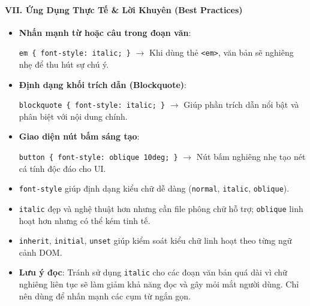 \documentclass[11pt,oneside]{book}
\newcommand{\codeinline}[1]{\textcolor{accentOrange}{\texttt{#1}}}
\begin{document}
\paragraph*{VII. Ứng Dụng Thực Tế \& Lời Khuyên (Best Practices)}

\begin{tipBox}
\begin{itemize}[leftmargin=1.5em, itemsep=4pt, parsep=0pt]
    \item \textbf{Nhấn mạnh từ hoặc câu trong đoạn văn}:
    \par\vspace{2pt}
    \codeinline{em \{ font-style: italic; \}} $\rightarrow$ Khi dùng thẻ \codeinline{<em>}, văn bản sẽ nghiêng nhẹ để thu hút sự chú ý.
    \item \textbf{Định dạng khối trích dẫn (Blockquote)}:
    \par\vspace{2pt}
    \codeinline{blockquote \{ font-style: italic; \}} $\rightarrow$ Giúp phần trích dẫn nổi bật và phân biệt với nội dung chính.
    \item \textbf{Giao diện nút bấm sáng tạo}:
    \par\vspace{2pt}
    \codeinline{button \{ font-style: oblique 10deg; \}} $\rightarrow$ Nút bấm nghiêng nhẹ tạo nét cá tính độc đáo cho UI.
\end{itemize}
\end{tipBox}

\begin{conceptBox}
\begin{itemize}[leftmargin=1.5em, itemsep=3pt, parsep=0pt]
    \item \codeinline{font-style} giúp định dạng kiểu chữ dễ dàng (\codeinline{normal}, \codeinline{italic}, \codeinline{oblique}).
    \item \codeinline{italic} đẹp và nghệ thuật hơn nhưng cần file phông chữ hỗ trợ; \codeinline{oblique} linh hoạt hơn nhưng có thể kém tinh tế.
    \item \codeinline{inherit}, \codeinline{initial}, \codeinline{unset} giúp kiểm soát kiểu chữ linh hoạt theo từng ngữ cảnh DOM.
    \item \textbf{Lưu ý đọc}: Tránh sử dụng \codeinline{italic} cho các đoạn văn bản quá dài vì chữ nghiêng liên tục sẽ làm giảm khả năng đọc và gây mỏi mắt người dùng. Chỉ nên dùng để nhấn mạnh các cụm từ ngắn gọn.
\end{itemize}
\end{conceptBox}
\end{document}
